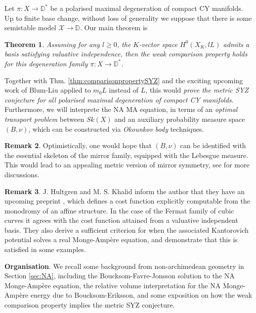\documentclass[a4paper]{article}
\newtheorem{thm}{Theorem}[section]
\theoremstyle{definition}
\newtheorem{rmk}[thm]{Remark}
\begin{document}
	
	
	
	
		Let $\pi: X\to \mathbb{D}^*$ be a polarised maximal degeneration of  compact CY manifolds. Up to finite base change, without loss of generality we suppose that there is some semistable model $\mathcal{X}\to \mathbb{D}$. 
	Our main theorem is 
	
	\begin{thm}
	 Assuming for any $l\geq 0$, the $K$-vector space $H^0(X_K, lL)$ admits a basis satisfying valuative independence, then the weak comparison property holds for this degeneration family $\pi: X\to \mathbb{D}^*$.
	\end{thm}
	
	
	
	
	Together with Thm. \ref{thm:comparisonpropertySYZ} and the exciting upcoming work of Blum-Liu applied to $m_0 L$ instead of $L$, this would \emph{prove the metric SYZ conjecture for all polarised maximal degeneration of compact CY manifolds}. Furthermore, we will interprete the NA MA equation, in terms of an \emph{optimal transport problem} between $Sk(X)$ and an auxiliary probability measure space $(B, \nu)$, which can be constructed via \emph{Okounkov body} techniques.
	
	
	
	\begin{rmk}
	Optimistically, one would hope that $(B,\nu)$ can be identified with the essential skeleton of the mirror family, equipped with the Lebesgue measure. This would lead to an appealing metric version of mirror symmetry, see \cite[Section 6.3]{Litheta} for more discussions.
	\end{rmk}
	
	
	
	
	
	\begin{rmk}
	J. Hultgren and M. S. Khalid inform the author that they have an upcoming preprint \cite{HultgrenKhalid}, which defines a cost function explicitly computable from the monodromy of an affine structure. In the case of the Fermat family of cubic curves it agrees with the cost function attained from a valuative independent basis. They also derive a sufficient criterion for when the  associated Kantorovich potential solves a real Monge-Amp\`ere equation, and demonstrate that this is satisfied in some examples. 
	\end{rmk}
	
	
	
	
	\textbf{Organisation}. We recall some background from non-archimedean geometry in Section \ref{sec:NA}, including the Boucksom-Favre-Jonsson solution to the NA Monge-Amp\`ere equation, the relative volume interpretation for the NA Monge-Amp\`ere energy due to Boucksom-Eriksson, and some exposition on how the weak comparison property implies the metric SYZ conjecture. 
	
\end{document}
